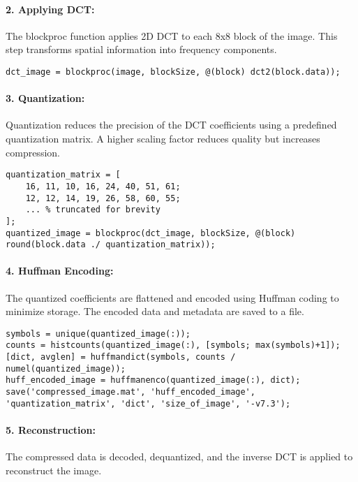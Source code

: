 \documentclass{article}
\begin{document}
\paragraph{2. Applying DCT:}
The blockproc function applies 2D DCT to each 8x8 block of the image. This step transforms spatial information into frequency components.

\begin{lstlisting}[caption=Applying 2D DCT]
dct_image = blockproc(image, blockSize, @(block) dct2(block.data));
\end{lstlisting}

\paragraph{3. Quantization:}
Quantization reduces the precision of the DCT coefficients using a predefined quantization matrix. A higher scaling factor reduces quality but increases compression.

\begin{lstlisting}[caption=Quantization Step]
quantization_matrix = [
    16, 11, 10, 16, 24, 40, 51, 61;
    12, 12, 14, 19, 26, 58, 60, 55;
    ... % truncated for brevity
];
quantized_image = blockproc(dct_image, blockSize, @(block) round(block.data ./ quantization_matrix));
\end{lstlisting}

\paragraph{4. Huffman Encoding:}
The quantized coefficients are flattened and encoded using Huffman coding to minimize storage. The encoded data and metadata are saved to a file.

\begin{lstlisting}[caption=Huffman Encoding and Saving]
symbols = unique(quantized_image(:));
counts = histcounts(quantized_image(:), [symbols; max(symbols)+1]);
[dict, avglen] = huffmandict(symbols, counts / numel(quantized_image));
huff_encoded_image = huffmanenco(quantized_image(:), dict);
save('compressed_image.mat', 'huff_encoded_image', 'quantization_matrix', 'dict', 'size_of_image', '-v7.3');
\end{lstlisting}

\paragraph{5. Reconstruction:}
The compressed data is decoded, dequantized, and the inverse DCT is applied to reconstruct the image.
\end{document}
